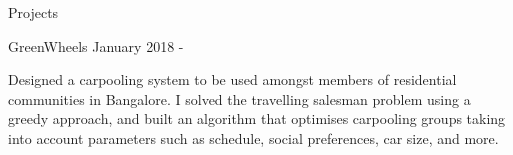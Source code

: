 \documentclass{resume} %
\begin{document}
\begin{rSection}{Projects}
\begin{rSubsection}{ GreenWheels }{ January 2018 -  }{}
\item Designed a carpooling system to be used amongst members of residential communities in Bangalore. I solved the travelling salesman problem using a greedy approach, and built an algorithm that optimises carpooling groups taking into account parameters such as schedule, social preferences, car size, and more.
\end{rSubsection}






























\end{rSection}
\end{document}
